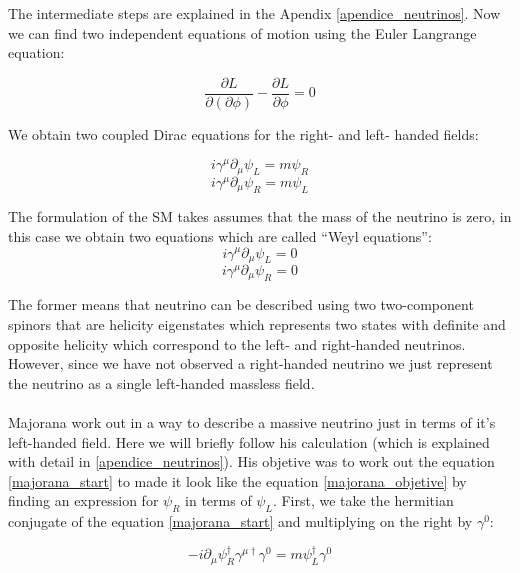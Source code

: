 The intermediate steps are explained in the Apendix \ref{apendice_neutrinos}. Now we can find two independent equations of motion using the Euler Langrange equation:

\begin{equation}
\frac{\partial L}{\partial (\partial \phi)} - \frac{\partial L}{\partial \phi} = 0
\end{equation}

We obtain two coupled Dirac equations for the right- and left- handed fields:

\begin{equation}
i \gamma ^\mu \partial_\mu \psi_L = m \psi_R
\end{equation} \label{majorana_objetive}
\begin{equation}
i \gamma ^\mu \partial_\mu \psi_R = m \psi_L
\end{equation} \label{majorana_start}

The formulation of the SM takes assumes that the mass of the neutrino is zero, in this case we obtain two equations which are called ``Weyl equations'':
\begin{equation}
i \gamma ^\mu \partial_\mu \psi_L = 0
\end{equation}
\begin{equation}
i \gamma ^\mu \partial_\mu \psi_R = 0
\end{equation}

The former means that neutrino can be described using two two-component spinors that are helicity eigenstates which represents two states with definite and opposite helicity which correspond to the left- and right-handed neutrinos. However, since we have not observed a right-handed neutrino we just represent the neutrino as a single left-handed massless field.  \\
\\
Majorana work out in a way to describe a massive neutrino just in terms of it's left-handed field. Here we will briefly follow his calculation (which is explained with detail in \ref{apendice_neutrinos}). His objetive was to work out the equation \ref{majorana_start} to made it look like the equation \ref{majorana_objetive} by finding an expression for $\psi_R$ in terms of $\psi_L$.  First, we take the hermitian conjugate of the equation \ref{majorana_start} and multiplying on the right by $\gamma^0$:

\begin{equation}
-i \partial_\mu \psi^{\dagger}_R \gamma^{\mu \dagger} \gamma^0 = m \psi^{\dagger}_L \gamma^0
\end{equation}

